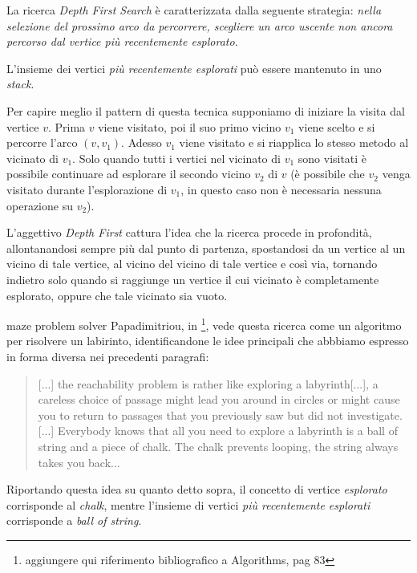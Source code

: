 La ricerca \emph{Depth First Search} \`e caratterizzata dalla seguente
strategia: \emph{nella selezione del prossimo arco da percorrere,
  scegliere un arco uscente non ancora percorso dal vertice pi\`u
  recentemente esplorato}.

L'insieme dei vertici \emph{pi\`u recentemente esplorati} pu\`o essere
mantenuto in uno \emph{stack}.

Per capire meglio il pattern di questa tecnica supponiamo di iniziare
la visita dal vertice $v$. Prima $v$ viene visitato, poi il suo primo
vicino $v_{1}$ viene scelto e si percorre l'arco $(v, v_{1})$. Adesso
$v_{1}$ viene visitato e si riapplica lo stesso metodo al vicinato di
$v_{1}$. Solo quando tutti i vertici nel vicinato di $v_{1}$ sono
visitati \`e possibile continuare ad esplorare il secondo vicino
$v_{2}$ di $v$ (\`e possibile che $v_{2}$ venga visitato durante
l'esplorazione di $v_{1}$, in questo caso non \`e necessaria nessuna
operazione su $v_{2}$).

L'aggettivo \emph{Depth First} cattura l'idea che la ricerca procede
in profondit\`a, allontanandosi sempre pi\`u dal punto di partenza,
spostandosi da un vertice al un vicino di tale vertice, al vicino del
vicino di tale vertice e cos\`i via, tornando indietro solo quando si
raggiunge un vertice il cui vicinato \`e completamente esplorato,
oppure che tale vicinato sia vuoto.

\begin{paragraph}{maze problem solver}
  Papadimitriou, in \footnote{aggiungere qui riferimento bibliografico
    a Algorithms, pag 83}, vede questa ricerca come un algoritmo per
  risolvere un labirinto, identificandone le idee principali che
  abbbiamo espresso in forma diversa nei precedenti paragrafi:
\begin{quotation}
  [...] the reachability problem is rather like exploring a
  labyrinth[...], a careless choice of passage might lead you around
  in circles or might cause you to return to passages that you
  previously saw but did not investigate.[...] Everybody knows that
  all you need to explore a labyrinth is a ball of string and a piece
  of chalk. The chalk prevents looping, the string always takes you
  back...
\end{quotation}
Riportando questa idea su quanto detto sopra, il concetto di vertice
\emph{esplorato} corrisponde al \emph{chalk}, mentre l'insieme di
vertici \emph{pi\`u recentemente esplorati} corrisponde a \emph{ball
  of string}.
\end{paragraph}

